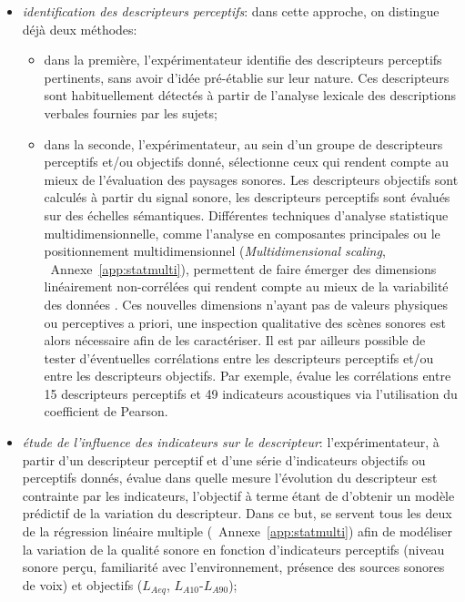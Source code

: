 \begin{itemize}

\item \emph{identification des descripteurs perceptifs}: dans cette approche, on distingue déjà deux méthodes:

\begin{itemize}
\item dans la première, l'expérimentateur identifie des descripteurs perceptifs pertinents, sans avoir d'idée pré-établie sur leur nature. Ces descripteurs sont habituellement détectés à partir de l'analyse lexicale des descriptions verbales fournies par les sujets;

\item dans la seconde, l'expérimentateur, au sein d'un groupe de descripteurs perceptifs et/ou objectifs donné, sélectionne ceux qui rendent compte au mieux de l'évaluation des paysages sonores. Les descripteurs objectifs sont calculés à partir du signal sonore, les descripteurs perceptifs sont évalués sur des échelles sémantiques. Différentes techniques d'analyse statistique multidimensionnelle, comme l'analyse en composantes principales ou le positionnement multidimensionnel (\emph{Multidimensional scaling}, \cf~Annexe~\ref{app:statmulti}), permettent de faire émerger des dimensions linéairement non-corrélées qui rendent compte au mieux de la variabilité des données \citep{cain2013development,torija2013application}. Ces nouvelles dimensions n'ayant pas de valeurs physiques ou perceptives a priori, une inspection qualitative des scènes sonores est alors nécessaire afin de les caractériser. Il est par ailleurs possible de tester d'éventuelles corrélations entre les descripteurs perceptifs et/ou entre les descripteurs objectifs. Par exemple, \citep{torija2013application} évalue les corrélations entre 15 descripteurs perceptifs et 49 indicateurs acoustiques via l'utilisation du coefficient de Pearson.
\end{itemize}

\item \emph{étude de l'influence des indicateurs sur le descripteur}: l'expérimentateur, à partir d'un descripteur perceptif et d'une série d'indicateurs objectifs ou perceptifs donnés, évalue dans quelle mesure l'évolution du descripteur est contrainte par les indicateurs, l'objectif à terme étant de d'obtenir un modèle prédictif de la variation du descripteur. Dans ce but, \citep{lavandier2006contribution,ricciardi2015sound} se servent tous les deux de la régression linéaire multiple (\cf~Annexe~\ref{app:statmulti}) afin de modéliser la variation de la qualité sonore en fonction d'indicateurs perceptifs (niveau sonore perçu, familiarité avec l'environnement, présence des sources sonores de voix) et objectifs ($L_{Aeq}$, $L_{A10}$-$L_{A90}$);


\end{itemize}
